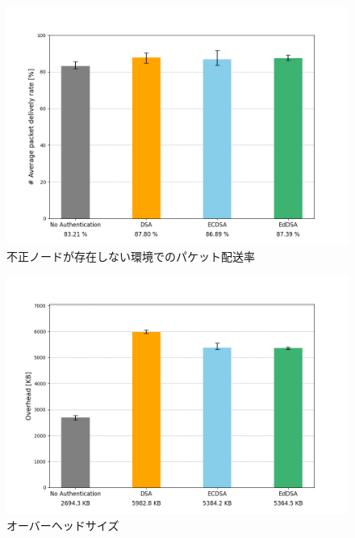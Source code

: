 \begin{figure}
  \centering
  \includegraphics[width=1\textwidth]{figures/exp2_pdr.png}
  \caption{不正ノードが存在しない環境でのパケット配送率}
  \label{fig:exp2_pdr}
\end{figure}
\clearpage
\begin{figure}
  \centering
  \includegraphics[width=1\textwidth]{figures/exp2_overhead.png}
  \caption{オーバーヘッドサイズ}
  \label{fig:exp2_overhead}
\end{figure}

